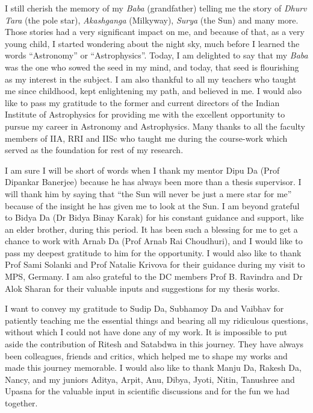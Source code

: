 \thispagestyle{empty}

I still cherish the memory of my {\it Baba} (grandfather) telling me the story of {\it Dhurv Tara} (the pole star), {\it Akashganga} (Milkyway), {\it Surya} (the Sun) and many more. Those stories had a very significant impact on me, and because of that, as a very young child, I started wondering about the night sky, much before I learned the words ``Astronomy'' or ``Astrophysics''. Today, I am delighted to say that my {\it Baba} was the one who sowed the seed in my mind, and today, that seed is flourishing as my interest in the subject. I am also thankful to all my teachers who taught me since childhood, kept enlightening my path, and believed in me. I would also like to pass my gratitude to the former and current directors of the Indian Institute of Astrophysics for providing me with the excellent opportunity to pursue my career in Astronomy and Astrophysics. Many thanks to all the faculty members of IIA, RRI and IISc who taught me during the course\hyp work which served as the foundation for rest of my research.


I am sure I will be short of words when I thank my mentor Dipu Da (Prof Dipankar Banerjee) because he has always been more than a thesis supervisor. I will thank him by saying that ``the Sun will never be just a mere star for me'' because of the insight he has given me to look at the Sun. I am beyond grateful to Bidya Da (Dr Bidya Binay Karak) for his constant guidance and support, like an elder brother, during this period. It has been such a blessing for me to get a chance to work with Arnab Da (Prof Arnab Rai Choudhuri), and I would like to pass my deepest gratitude to him for the opportunity. I would also like to thank Prof Sami Solanki and Prof Natalie Krivova for their guidance during my visit to MPS, Germany. I am also grateful to the DC members Prof B. Ravindra and Dr Alok Sharan for their valuable inputs and suggestions for my thesis works.

I want to convey my gratitude to Sudip Da, Subhamoy Da and Vaibhav for patiently teaching me the essential things and bearing all my ridiculous questions, without which I could not have done any of my work. It is impossible to put aside the contribution of Ritesh and Satabdwa in this journey. They have always been colleagues, friends and critics, which helped me to shape my works and made this journey memorable. I would also like to thank Manju Da, Rakesh Da, Nancy, and my juniors Aditya, Arpit, Anu, Dibya, Jyoti, Nitin, Tanushree and Upasna for the valuable input in scientific discussions and for the fun we had together.

